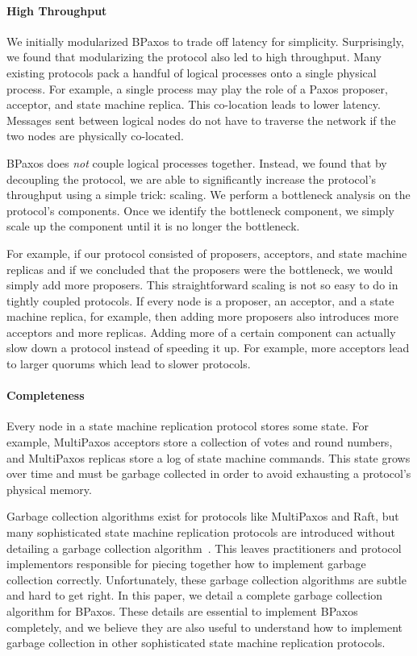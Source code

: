 \paragraph{High Throughput}
We initially modularized BPaxos to trade off latency for simplicity.
Surprisingly, we found that modularizing the protocol also led to high
throughput. Many existing protocols pack a handful of logical processes onto a
single physical process. For example, a single process may play the role of a
Paxos proposer, acceptor, and state machine replica. This co-location leads to
lower latency. Messages sent between logical nodes do not have to traverse the
network if the two nodes are physically co-located.

BPaxos does \emph{not} couple logical processes together. Instead, we found
that by decoupling the protocol, we are able to significantly increase the
protocol's throughput using a simple trick: scaling. We perform a bottleneck
analysis on the protocol's components. Once we identify the bottleneck
component, we simply scale up the component until it is no longer the
bottleneck.

For example, if our protocol consisted of proposers, acceptors, and state
machine replicas and if we concluded that the proposers were the bottleneck, we
would simply add more proposers. This straightforward scaling is not so easy to
do in tightly coupled protocols. If every node is a proposer, an acceptor, and
a state machine replica, for example, then adding more proposers also
introduces more acceptors and more replicas. Adding more of a certain component
can actually slow down a protocol instead of speeding it up. For example, more
acceptors lead to larger quorums which lead to slower protocols.

\paragraph{Completeness}
Every node in a state machine replication protocol stores some state. For
example, MultiPaxos acceptors store a collection of votes and round numbers,
and MultiPaxos replicas store a log of state machine commands. This state grows
over time and must be garbage collected in order to avoid exhausting a
protocol's physical memory.

Garbage collection algorithms exist for protocols like MultiPaxos and Raft, but
many sophisticated state machine replication protocols are introduced without
detailing a garbage collection algorithm~\cite{%
  moraru2013there, %
  arun2017speeding, %
  zhang2018building, %
  mu2016consolidating %
}. This leaves practitioners and protocol implementors responsible for piecing
together how to implement garbage collection correctly. Unfortunately, these
garbage collection algorithms are subtle and hard to get right. In this paper,
we detail a complete garbage collection algorithm for BPaxos. These details are
essential to implement BPaxos completely, and we believe they are also useful
to understand how to implement garbage collection in other sophisticated state
machine replication protocols.

